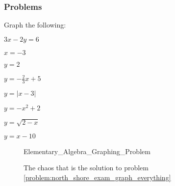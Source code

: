 \documentclass[crop=false,class=book,oneside]{standalone}
\begin{document}
            \subsubsection{Problems}
            \begin{problem}
            \label{problem:north_shore_exam_graph_everything}Graph the following:
            \begin{enumerate}
            \begin{multicols}{4}
                \item $3x-2y=6$
                \item $x=-3$
                \item $y=2$
                \item $y=-\frac{2}{3}x+5$
                \item $y=|x-3|$
                \item $y=-x^2+2$
                \item $y=\sqrt{2-x}$
                \item $y=x-10$
            \end{multicols}
            \end{enumerate}
            \end{problem}
            \begin{figure}[H]
                \centering
                \captionsetup{type=figure}
                
                          {Elementary_Algebra_Graphing_Problem}
                \caption{The chaos that is the solution to problem \ref{problem:north_shore_exam_graph_everything}}
                \label{fig:north_shore_graphing_problem}
            \end{figure}
\end{document}

